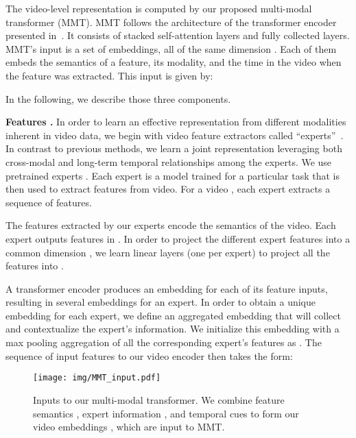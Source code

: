\documentclass[runningheads]{llncs}
\begin{document}
The video-level representation is computed by our proposed multi-modal transformer (MMT). MMT follows the architecture of the transformer encoder presented in~\cite{vaswani2017transformer}. It consists of stacked self-attention layers and fully collected layers. MMT's input  is a set of embeddings, all of the same dimension . Each of them embeds the semantics of a feature, its modality, and the time in the video when the feature was extracted. This input is given by:


In the following, we describe those three components.

\noindent\textbf{Features .} 
In order to learn an effective representation from different modalities inherent in video data, we begin with video feature extractors called ``experts''~\cite{mithun2018learning,Yu2018JSFusion,miech2018learning,liu2019use}. In contrast to previous methods, we learn a joint representation leveraging both cross-modal and long-term temporal relationships among the experts.
We use  pretrained experts . Each expert is a model trained for a particular task that is then used to extract features from video. For a video , each expert extracts a sequence  of  features.

The features extracted by our experts encode the semantics of the video. Each expert  outputs features in .
In order to project the different expert features into a common dimension , we learn  linear layers (one per expert) to project all the features into .

A transformer encoder produces an embedding for each of its feature inputs, resulting in several embeddings for an expert. In order to obtain a unique embedding for each expert, we define an aggregated embedding  that will collect and contextualize the expert's information. We initialize this embedding with a max pooling aggregation of all the corresponding expert's features as . The sequence of input features to our video encoder then takes the form:


\begin{figure*}[t]
\begin{center}
\texttt{[image: img/MMT\_input.pdf]}
\end{center}
   \caption{Inputs to our multi-modal transformer. We combine feature semantics , expert information , and temporal cues  to form our video embeddings , which are input to MMT.}
\label{fig:vid_transformer_input}
\end{figure*}
\end{document}
